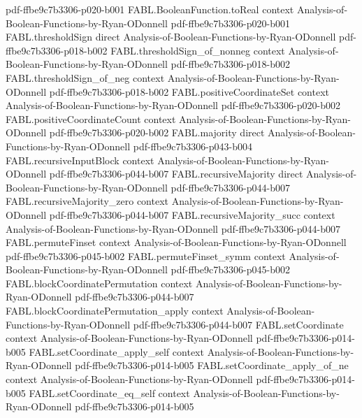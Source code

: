 \begin{theorem}
  {pdf-ffbe9c7b3306-p020-b001}
\proofstep
  {FABL.BooleanFunction.toReal}
  {context}
  {Analysis-of-Boolean-Functions-by-Ryan-ODonnell}
  {pdf-ffbe9c7b3306-p020-b001}
\proofstep
  {FABL.thresholdSign}
  {direct}
  {Analysis-of-Boolean-Functions-by-Ryan-ODonnell}
  {pdf-ffbe9c7b3306-p018-b002}
\proofstep
  {FABL.thresholdSign_of_nonneg}
  {context}
  {Analysis-of-Boolean-Functions-by-Ryan-ODonnell}
  {pdf-ffbe9c7b3306-p018-b002}
\proofstep
  {FABL.thresholdSign_of_neg}
  {context}
  {Analysis-of-Boolean-Functions-by-Ryan-ODonnell}
  {pdf-ffbe9c7b3306-p018-b002}
\proofstep
  {FABL.positiveCoordinateSet}
  {context}
  {Analysis-of-Boolean-Functions-by-Ryan-ODonnell}
  {pdf-ffbe9c7b3306-p020-b002}
\proofstep
  {FABL.positiveCoordinateCount}
  {context}
  {Analysis-of-Boolean-Functions-by-Ryan-ODonnell}
  {pdf-ffbe9c7b3306-p020-b002}
\proofstep
  {FABL.majority}
  {direct}
  {Analysis-of-Boolean-Functions-by-Ryan-ODonnell}
  {pdf-ffbe9c7b3306-p043-b004}
\proofstep
  {FABL.recursiveInputBlock}
  {context}
  {Analysis-of-Boolean-Functions-by-Ryan-ODonnell}
  {pdf-ffbe9c7b3306-p044-b007}
\proofstep
  {FABL.recursiveMajority}
  {direct}
  {Analysis-of-Boolean-Functions-by-Ryan-ODonnell}
  {pdf-ffbe9c7b3306-p044-b007}
\proofstep
  {FABL.recursiveMajority_zero}
  {context}
  {Analysis-of-Boolean-Functions-by-Ryan-ODonnell}
  {pdf-ffbe9c7b3306-p044-b007}
\proofstep
  {FABL.recursiveMajority_succ}
  {context}
  {Analysis-of-Boolean-Functions-by-Ryan-ODonnell}
  {pdf-ffbe9c7b3306-p044-b007}
\proofstep
  {FABL.permuteFinset}
  {context}
  {Analysis-of-Boolean-Functions-by-Ryan-ODonnell}
  {pdf-ffbe9c7b3306-p045-b002}
\proofstep
  {FABL.permuteFinset_symm}
  {context}
  {Analysis-of-Boolean-Functions-by-Ryan-ODonnell}
  {pdf-ffbe9c7b3306-p045-b002}
\proofstep
  {FABL.blockCoordinatePermutation}
  {context}
  {Analysis-of-Boolean-Functions-by-Ryan-ODonnell}
  {pdf-ffbe9c7b3306-p044-b007}
\proofstep
  {FABL.blockCoordinatePermutation_apply}
  {context}
  {Analysis-of-Boolean-Functions-by-Ryan-ODonnell}
  {pdf-ffbe9c7b3306-p044-b007}
\proofstep
  {FABL.setCoordinate}
  {context}
  {Analysis-of-Boolean-Functions-by-Ryan-ODonnell}
  {pdf-ffbe9c7b3306-p014-b005}
\proofstep
  {FABL.setCoordinate_apply_self}
  {context}
  {Analysis-of-Boolean-Functions-by-Ryan-ODonnell}
  {pdf-ffbe9c7b3306-p014-b005}
\proofstep
  {FABL.setCoordinate_apply_of_ne}
  {context}
  {Analysis-of-Boolean-Functions-by-Ryan-ODonnell}
  {pdf-ffbe9c7b3306-p014-b005}
\proofstep
  {FABL.setCoordinate_eq_self}
  {context}
  {Analysis-of-Boolean-Functions-by-Ryan-ODonnell}
  {pdf-ffbe9c7b3306-p014-b005}
\proofstep

\end{theorem}
